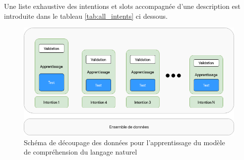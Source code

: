 	Une liste exhaustive des intentions et slots accompagnée d'une description est introduite dans le tableau \ref{tab:all_intents} ci dessous.
	\begin{figure}[H]
		\centering
		\includegraphics[width=.75\linewidth]{images/implementation/split.png} 
		\caption{Schéma de découpage des données pour l'apprentissage du modèle de compréhension du langage naturel} 
		\label{fig:split}
	\end{figure}

